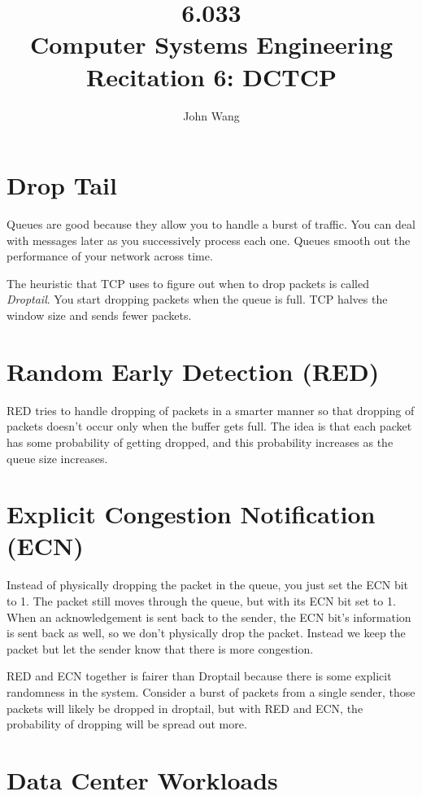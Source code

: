 \documentclass[psamsfonts]{amsart}
\title{6.033 \\
Computer Systems Engineering \\
Recitation 6: DCTCP}
\author{John Wang}
\begin{document}
\maketitle

\section{Drop Tail}

Queues are good because they allow you to handle a burst of traffic. You can deal with messages later as you successively process each one. Queues smooth out the performance of your network across time.

The heuristic that TCP uses to figure out when to drop packets is called \emph{Droptail}. You start dropping packets when the queue is full. TCP halves the window size and sends fewer packets.

\section{Random Early Detection (RED)}

RED tries to handle dropping of packets in a smarter manner so that dropping of packets doesn't occur only when the buffer gets full. The idea is that each packet has some probability of getting dropped, and this probability increases as the queue size increases.

\section{Explicit Congestion Notification (ECN)}

Instead of physically dropping the packet in the queue, you just set the ECN bit to 1. The packet still moves through the queue, but with its ECN bit set to 1. When an acknowledgement is sent back to the sender, the ECN bit's information is sent back as well, so we don't physically drop the packet. Instead we keep the packet but let the sender know that there is more congestion.

RED and ECN together is fairer than Droptail because there is some explicit randomness in the system. Consider a burst of packets from a single sender, those packets will likely be dropped in droptail, but with RED and ECN, the probability of dropping will be spread out more.

\section{Data Center Workloads}
\end{document}
